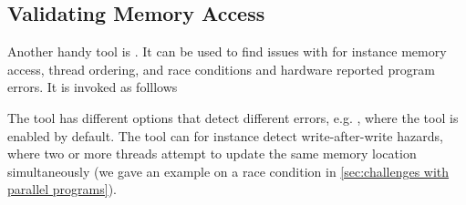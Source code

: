\subsection{Validating Memory Access}
\label{sec:validating memory access}

Another handy tool is .
It can be used to find issues with for instance memory access, thread ordering, and race conditions and hardware reported program errors.
It is invoked as folllows
%
\begin{quote}
\end{quote}
%
The  tool has different options that detect different errors, e.g. , where the  tool is enabled by default.
The  tool can for instance detect write-after-write hazards, where two or more threads attempt to update the same memory location simultaneously (we gave an example on a race condition in \cref{sec:challenges with parallel programs}).~\cite{cudamemcheck2015doc}

